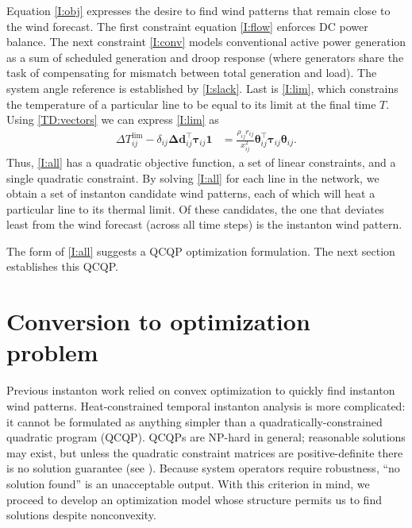 \documentclass[conference]{IEEEtran}
\begin{document}
Equation \eqref{I:obj} expresses the desire to find wind patterns that
remain close to the wind forecast. The first constraint equation
\eqref{I:flow} enforces DC power balance. The next constraint
\eqref{I:conv} models conventional active power generation as a sum of
scheduled generation and droop response (where generators share the
task of compensating for mismatch between total generation and
load). The system angle reference is established by
\eqref{I:slack}. Last is \eqref{I:lim}, which constrains the
temperature of a particular line to be equal to its limit at the final
time $T$. Using \eqref{TD:vectors} we can express
\eqref{I:lim} as
\begin{align}\label{temp}
\Delta T_{ij}^{\text{lim}} - \delta_{ij} \boldsymbol{\Delta d}_{ij}^\top \boldsymbol{\tau}_{ij}\mathbf{1}   &= \frac{\rho_{ij}r_{ij}}{x_{ij}^2} \boldsymbol{\theta}_{ij}^\top \boldsymbol{\tau}_{ij} \boldsymbol{\theta}_{ij}.
\end{align}
Thus, \eqref{I:all} has a quadratic objective function, a set of linear constraints, and a single quadratic constraint. By solving \eqref{I:all} for each line in the network, we obtain a set of instanton candidate wind patterns, each of which will heat a particular line to its thermal limit. Of these candidates, the one that deviates least from the wind forecast (across all time steps) is the instanton wind pattern.

The form of \eqref{I:all} suggests a QCQP optimization
formulation. The next section establishes this QCQP.

\section{Conversion to optimization problem}\label{sec:optimization}

Previous instanton work relied on convex optimization to quickly find instanton wind patterns. Heat-constrained temporal instanton analysis is more complicated:  it cannot be formulated as anything simpler than a quadratically-constrained quadratic program (QCQP). QCQPs are NP-hard in general; reasonable solutions may exist, but unless the quadratic constraint matrices are positive-definite there is no solution guarantee (see \cite{mehanna2014}). Because system operators require robustness, ``no solution found'' is an unacceptable output. With this criterion in mind, we proceed to develop an optimization model whose structure permits us to find solutions despite nonconvexity.
\end{document}
